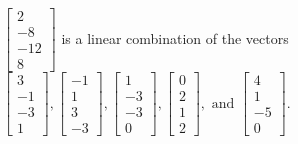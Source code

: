 \begin{exercise}
\begin{exerciseStatement}
  \end{exerciseStatement}
  \begin{exerciseAnswer}
   \(\left[\begin{array}{c}
2 \\
-8 \\
-12 \\
8
\end{array}\right]\) 
  	 is  
	a linear combination of the vectors \(\left[\begin{array}{c}
3 \\
-1 \\
-3 \\
1
\end{array}\right] , \left[\begin{array}{c}
-1 \\
1 \\
3 \\
-3
\end{array}\right] , \left[\begin{array}{c}
1 \\
-3 \\
-3 \\
0
\end{array}\right] , \left[\begin{array}{c}
0 \\
2 \\
1 \\
2
\end{array}\right] , \text{ and } \left[\begin{array}{c}
4 \\
1 \\
-5 \\
0
\end{array}\right]\).

	
  


  \end{exerciseAnswer}
\end{exercise}